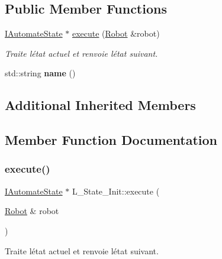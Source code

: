 \subsection*{Public Member Functions}
\begin{DoxyCompactItemize}
\item 
\hyperlink{classIAutomateState}{I\+Automate\+State} $\ast$ \hyperlink{classL__State__Init_a444992513b49078f12eaa858f11591fe}{execute} (\hyperlink{classRobot}{Robot} \&robot)
\begin{DoxyCompactList}\small\item\em Traite l\textquotesingle{}état actuel et renvoie l\textquotesingle{}état suivant. \end{DoxyCompactList}\item 
\mbox{\label{classL__State__Init_a574237b17ac928d584b845744782061a}} 
std\+::string {\bfseries name} ()
\end{DoxyCompactItemize}
\subsection*{Additional Inherited Members}


\subsection{Member Function Documentation}
\mbox{\label{classL__State__Init_a444992513b49078f12eaa858f11591fe}} 
\subsubsection{\texorpdfstring{execute()}{execute()}}
{\footnotesize\ttfamily \hyperlink{classIAutomateState}{I\+Automate\+State} $\ast$ L\+\_\+\+State\+\_\+\+Init\+::execute (\begin{DoxyParamCaption}\item[{\hyperlink{classRobot}{Robot} \&}]{robot }\end{DoxyParamCaption})\hspace{0.3cm}{\ttfamily [virtual]}}



Traite l\textquotesingle{}état actuel et renvoie l\textquotesingle{}état suivant. 

